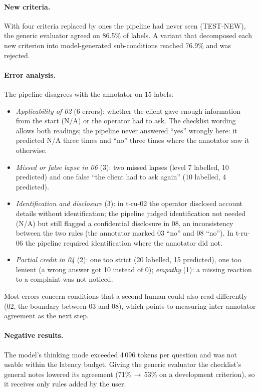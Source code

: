 \documentclass[11pt,a4paper]{article}
\begin{document}
\paragraph{New criteria.} With four criteria replaced by ones the pipeline had never seen (TEST-NEW), the
generic evaluator agreed on 86.5\% of labels. A variant that decomposed each new criterion into
model-generated sub-conditions reached 76.9\% and was rejected.

\paragraph{Error analysis.} The pipeline disagrees with the annotator on 15 labels:
\begin{itemize}\itemsep0pt
\item \emph{Applicability of 02} (6 errors): whether the client gave enough information from the start
(N/A) or the operator had to ask. The checklist wording allows both readings; the pipeline never answered
``yes'' wrongly here: it predicted N/A three times and ``no'' three times where the annotator saw it otherwise.
\item \emph{Missed or false lapse in 06} (3): two missed lapses (level 7 labelled, 10 predicted) and one
false ``the client had to ask again'' (10 labelled, 4 predicted).
\item \emph{Identification and disclosure} (3): in t-ru-02 the operator disclosed account details without
identification; the pipeline judged identification not needed (N/A) but still flagged a confidential
disclosure in 08, an inconsistency between the two rules (the annotator marked 03 ``no'' and 08 ``no''). In
t-ru-06 the pipeline required identification where the annotator did not.
\item \emph{Partial credit in 04} (2): one too strict (20 labelled, 15 predicted), one too lenient (a wrong
answer got 10 instead of 0); \emph{empathy} (1): a missing reaction to a complaint was not noticed.
\end{itemize}
Most errors concern conditions that a second human could also read differently (02, the boundary between
03 and 08), which points to measuring inter-annotator agreement as the next step.

\paragraph{Negative results.} The model's thinking mode exceeded 4\,096 tokens per question and was not usable
within the latency budget. Giving the generic evaluator the checklist's general notes lowered its agreement
(71\%\,$\rightarrow$\,53\% on a development criterion), so it receives only rules added by the user.
\end{document}
